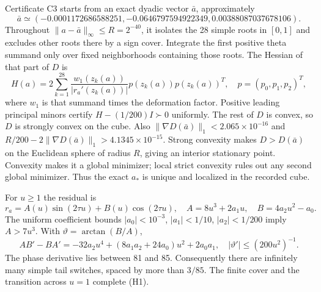 \documentclass[11pt,a4paper]{article}
\numberwithin{equation}{section}
\theoremstyle{remark}\newtheorem{remark}[theorem]{Remark}
\newcommand{\norm}[1]{\lVert#1\rVert}
\begin{document}
Certificate C3 starts from an exact dyadic vector $\bar a$, approximately
\begin{equation}
 \bar a\simeq(-0.0001172686588251,
           -0.0646797594922349,
            0.00388087037678106).
\end{equation}
Throughout $\norm{a-\bar a}_\infty\le R=2^{-40}$, it isolates the 28 simple
roots in $[0,1]$ and excludes other roots there by a sign cover. Integrate
the first positive theta summand only over fixed neighborhoods containing
those roots. The Hessian of that part of $D$ is
\begin{equation}
 H(a)=2\sum_{k=1}^{28}
 \frac{w_1(z_k(a))}{|r_a'(z_k(a))|}
 p(z_k(a))p(z_k(a))^T,\quad p=(p_0,p_1,p_2)^T,
\end{equation}
where $w_1$ is that summand times the deformation factor. Positive leading
principal minors certify $H-(1/200)I\succ0$ uniformly. The rest of $D$ is
convex, so $D$ is strongly convex on the cube. Also
$\norm{\nabla D(\bar a)}_1<2.065\times10^{-16}$ and
$R/200-2\norm{\nabla D(\bar a)}_1>4.1345\times10^{-15}$.
Strong convexity makes $D>D(\bar a)$ on the Euclidean sphere of radius $R$,
giving an interior stationary point. Convexity makes it a global
minimizer; local strict convexity rules out any second global minimizer.
Thus the exact $a_*$ is unique and localized in the recorded cube.

For $u\ge1$ the residual is
\begin{equation}
 r_a=A(u)\sin(2\tau u)+B(u)\cos(2\tau u),\quad
 A=8u^3+2a_1u,\quad B=4a_2u^2-a_0.\label{eq:phase}
\end{equation}
The uniform coefficient bounds
$|a_0|<10^{-3}$, $|a_1|<1/10$, $|a_2|<1/200$ imply $A>7u^3$.
With $\vartheta=\arctan(B/A)$,
\begin{equation}
 AB'-BA'=-32a_2u^4+(8a_1a_2+24a_0)u^2+2a_0a_1,
 \quad |\vartheta'|\le(200u^2)^{-1}.
\end{equation}
The phase derivative lies between 81 and 85. Consequently there are
infinitely many simple tail switches, spaced by more than $3/85$.
The finite cover and the transition across $u=1$ complete (H1).
\end{document}
